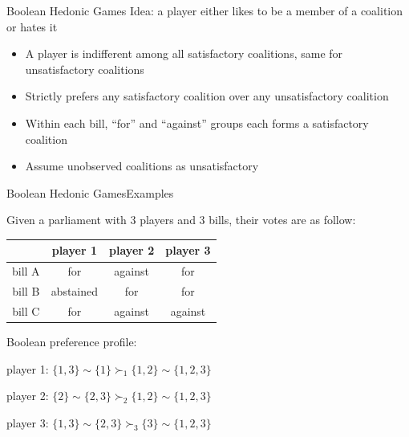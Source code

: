 \documentclass[xcolor=dvipsnames]{beamer}
\begin{document}
\begin{frame}{Boolean Hedonic Games}
  Idea: a player either likes to be a member of a coalition or hates it
  \begin{itemize}
    \item A player is indifferent among all satisfactory coalitions, same for unsatisfactory coalitions
    \item Strictly prefers any satisfactory coalition over any unsatisfactory coalition
    \item Within each bill, ``for'' and ``against'' groups each forms a satisfactory coalition
    \item Assume unobserved coalitions as unsatisfactory
  \end{itemize}
\end{frame}


\begin{frame}{Boolean Hedonic Games}{Examples}
  \begin{example}
  \label{example:votes_boolean}
    Given a parliament with 3 players and 3 bills, their votes are as follow:

    \begin{table}[ht]
    \centering
    \begin{tabular}{|c|c|c|c|}
    \hline
           & player 1  & player 2 & player 3 \\ \hline
    bill A & for       & against  & for \\
    bill B & abstained & for      & for \\
    bill C & for       & against  & against \\
    \hline
    \end{tabular}
    \end{table}
  \end{example}

  \alert{Boolean} preference profile:

  player 1: $\{1, 3\} \sim \{1\} \succ_1 \{1, 2\} \sim \{1, 2, 3\}$

  player 2: $\{2\} \sim \{2, 3\} \succ_2 \{1, 2\} \sim \{1, 2, 3\}$

  player 3: $\{1, 3\} \sim \{2, 3\} \succ_3 \{3\} \sim \{1, 2, 3\}$

\end{frame}
\end{document}
